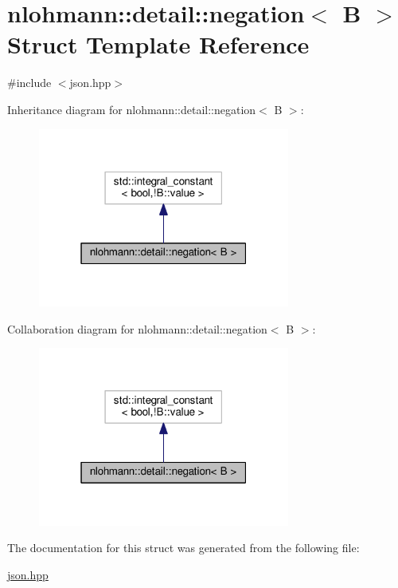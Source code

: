 \hypertarget{structnlohmann_1_1detail_1_1negation}{}\section{nlohmann\+:\+:detail\+:\+:negation$<$ B $>$ Struct Template Reference}
\label{structnlohmann_1_1detail_1_1negation}


{\ttfamily \#include $<$json.\+hpp$>$}



Inheritance diagram for nlohmann\+:\+:detail\+:\+:negation$<$ B $>$\+:\nopagebreak
\begin{figure}[H]
\begin{center}
\leavevmode
\includegraphics[width=235pt]{structnlohmann_1_1detail_1_1negation__inherit__graph}
\end{center}
\end{figure}


Collaboration diagram for nlohmann\+:\+:detail\+:\+:negation$<$ B $>$\+:\nopagebreak
\begin{figure}[H]
\begin{center}
\leavevmode
\includegraphics[width=235pt]{structnlohmann_1_1detail_1_1negation__coll__graph}
\end{center}
\end{figure}


The documentation for this struct was generated from the following file\+:\begin{DoxyCompactItemize}
\item 
\hyperlink{json_8hpp}{json.\+hpp}\end{DoxyCompactItemize}
